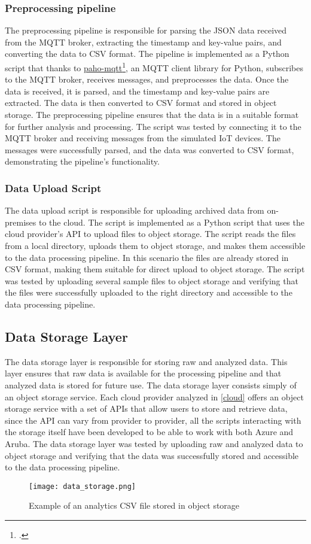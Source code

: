 \subsubsection{Preprocessing pipeline}
The preprocessing pipeline is responsible for parsing the JSON data received from the MQTT broker, extracting the timestamp and key-value pairs, and converting the data to CSV format. The pipeline is implemented as a Python script that thanks to \href{https://pypi.org/project/paho-mqtt/}{paho-mqtt}\footcite{site:paho-mqtt}, an MQTT client library for Python, subscribes to the MQTT broker, receives messages, and preprocesses the data. Once the data is received, it is parsed, and the timestamp and key-value pairs are extracted. The data is then converted to CSV format and stored in object storage. The preprocessing pipeline ensures that the data is in a suitable format for further analysis and processing. The script was tested by connecting it to the MQTT broker and receiving messages from the simulated IoT devices. The messages were successfully parsed, and the data was converted to CSV format, demonstrating the pipeline's functionality.

\subsubsection{Data Upload Script}
The data upload script is responsible for uploading archived data from on-premises to the cloud. The script is implemented as a Python script that uses the cloud provider's API to upload files to object storage. The script reads the files from a local directory, uploads them to object storage, and makes them accessible to the data processing pipeline. In this scenario the files are already stored in CSV format, making them suitable for direct upload to object storage. The script was tested by uploading several sample files to object storage and verifying that the files were successfully uploaded to the right directory and accessible to the data processing pipeline. 

\subsection{Data Storage Layer}
The data storage layer is responsible for storing raw and analyzed data. This layer ensures that raw data is available for the processing pipeline and that analyzed data is stored for future use. The data storage layer consists simply of an object storage service. Each cloud provider analyzed in \ref{cloud} offers an object storage service with a set of APIs that allow users to store and retrieve data, since the API can vary from provider to provider, all the scripts interacting with the storage itself have been developed to be able to work with both Azure and Aruba. The data storage layer was tested by uploading raw and analyzed data to object storage and verifying that the data was successfully stored and accessible to the data processing pipeline.
\begin{figure}[htbp]
    \centering
    \texttt{[image: data\_storage.png]}
    \caption{Example of an analytics CSV file stored in object storage}
    \label{fig:storage}
\end{figure}


